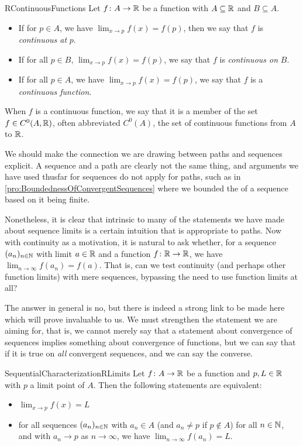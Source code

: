 \documentclass[11pt]{article}
\begin{document}
\begin{label definition}{RContinuousFunctions}
Let $f\colon A \to \mathbb{R}$ be a function with $A \subseteq \mathbb{R}$ and $B \subseteq A$. \begin{itemize}
\item If for $p \in A$, we have $\lim_{x \to p}f(x) = f(p)$, then we say that $f$ is \emph{continuous at} $p$.
\item If for all $p\in B$, $\lim_{x \to p}f(x) = f(p)$, we say that $f$ is \emph{continuous on} $B$.
\item If for all $p\in A$, we have $\lim_{x \to p}f(x) = f(p)$, we say that $f$ is a \emph{continuous function}.
\end{itemize}
When $f$ is a continuous function, we say that it is a member of the set $f \in C^0(A,\mathbb{R})$, often abbreviated $C^0(A)$, the set of continuous functions from $A$ to $\mathbb{R}$.
\end{label definition}

We should make the connection we are drawing between paths and sequences explicit. A sequence and a path are clearly not the same thing, and arguments we have used thusfar for sequences do not apply for paths, such as in \ref{pro:BoundednessOfConvergentSequences} where we bounded the  of a sequence based on it being finite.

Nonetheless, it is clear that intrinsic to many of the statements we have made about sequence limits is a certain intuition that is appropriate to paths. Now with continuity as a motivation, it is natural to ask whether, for a sequence $(a_n)_{n \in \mathbb{N}}$ with limit $a \in \mathbb{R}$ and a function $f\colon \mathbb{R} \to \mathbb{R}$, we have $\lim_{n\to\infty}f(a_n) = f(a)$. That is, can we test continuity (and perhaps other function limits) with mere sequences, bypassing the need to use function limits at all?

The answer in general is no, but there is indeed a strong link to be made here which will prove invaluable to us. We must strengthen the statement we are aiming for, that is, we cannot merely say that a statement about convergence of sequences implies something about convergence of functions, but we can say that if it is true on \emph{all} convergent sequences, and we can say the converse.

\begin{label theorem}{SequentialCharacterizationRLimits}
Let $f\colon A \to \mathbb{R}$ be a function and $p,L \in \mathbb{R}$ with $p$ a limit point of $A$. Then the following statements are equivalent: \begin{itemize}
\item $\displaystyle{\lim_{x\to p} f(x) = L}$
\item for all sequences $(a_n)_{n \in \mathbb{N}}$ with $a_n \in A$ (and $a_n \neq p$ if $p \notin A$) for all $n \in \mathbb{N}$, and with $a_n \to p$ as $n \to \infty$, we have $\lim_{n \to \infty} f(a_n) = L$.
\end{itemize}
\end{label theorem}
\end{document}
